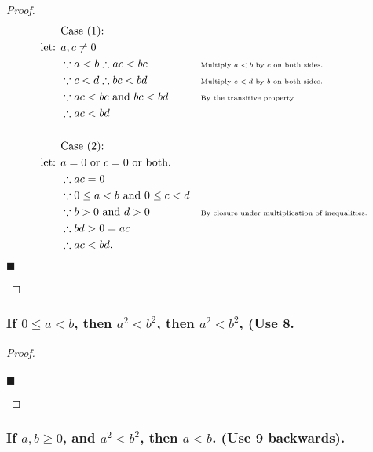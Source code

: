 \documentclass[letterpaper, 10 pt, conference]{ieeeconf}  %
\begin{document}
\begin{proof}
\begin{align}
    &\text{Case (1): } &&\\
    \text{let: } & a, c \neq 0 &&\\
    &\because a < b \therefore ac < bc && \text{\tiny{Multiply $a < b$ by $c$ on both sides.}} \\
    &\because c < d \therefore bc < bd && \text{\tiny{Multiply $c < d$ by $b$ on both sides.}} \\
    &\because ac < bc \text{ and } bc < bd && \text{\tiny{By the transitive property}} \\ 
    &\therefore ac < bd && \\\\
    &\text{Case (2): } &&\\
    \text{let: } & a = 0 \text { or } c = 0 \text{ or both. }&&\\
    &\therefore ac = 0&&\\
    &\because 0 \leq a < b \text{ and } 0 \leq c < d && \\
    &\because b > 0 \text{ and } d > 0 && \text{\tiny{By closure under multiplication of inequalities.}}\\
    &\therefore bd > 0 = ac &&\\
    &\therefore ac < bd.&&
\end{align}
\begin{flushright}
$\blacksquare$
\end{flushright}
\end{proof}

\subsubsection{\textbf{If $0 \leq a < b$, then $a^2 < b^2$, then $a^2 < b^2$, (Use 8.}}

\begin{proof}
\begin{align}
    
\end{align}
\begin{flushright}
$\blacksquare$
\end{flushright}
\end{proof}

\subsubsection{\textbf{If $a, b \geqslant  0$, and $a^2 < b^2$, then $a < b$. (Use 9 backwards).}}
\end{document}
